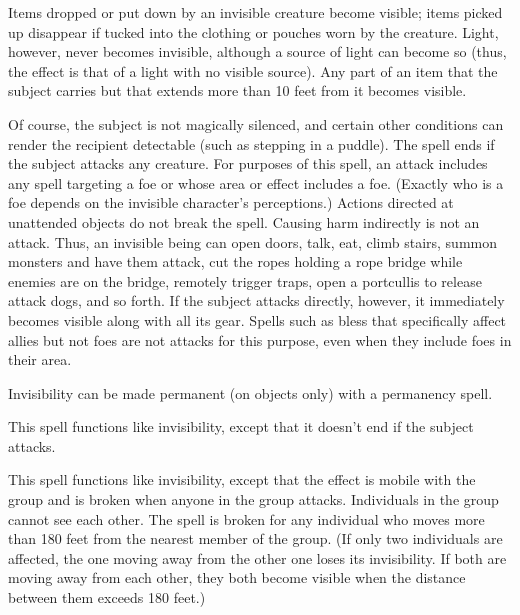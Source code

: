\begin{multicols}{2}
\begin{small}
\smallskip\noindent Items dropped or put down by an invisible creature become visible; items picked up disappear if tucked into the clothing or pouches worn by the creature. Light, however, never becomes invisible, although a source of light can become so (thus, the effect is that of a light with no visible source). Any part of an item that the subject carries but that extends more than 10 feet from it becomes visible.

\smallskip\noindent Of course, the subject is not magically silenced, and certain other conditions can render the recipient detectable (such as stepping in a puddle). The spell ends if the subject attacks any creature. For purposes of this spell, an attack includes any spell targeting a foe or whose area or effect includes a foe. (Exactly who is a foe depends on the invisible character's perceptions.) Actions directed at unattended objects do not break the spell. Causing harm indirectly is not an attack. Thus, an invisible being can open doors, talk, eat, climb stairs, summon monsters and have them attack, cut the ropes holding a rope bridge while enemies are on the bridge, remotely trigger traps, open a portcullis to release attack dogs, and so forth. If the subject attacks directly, however, it immediately becomes visible along with all its gear. Spells such as bless that specifically affect allies but not foes are not attacks for this purpose, even when they include foes in their area.

\smallskip\noindent Invisibility can be made permanent (on objects only) with a permanency spell.


\noindent This spell functions like invisibility, except that it doesn't end if the subject attacks.

\noindent This spell functions like invisibility, except that the effect is mobile with the group and is broken when anyone in the group attacks. Individuals in the group cannot see each other. The spell is broken for any individual who moves more than 180 feet from the nearest member of the group. (If only two individuals are affected, the one moving away from the other one loses its invisibility. If both are moving away from each other, they both become visible when the distance between them exceeds 180 feet.)


\end{small}
\end{multicols}
